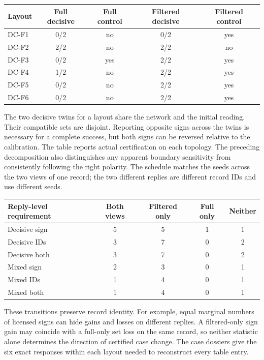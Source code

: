 \documentclass[12pt,letterpaper]{article}
\begin{document}
\begin{center}{\small\setlength{\tabcolsep}{4pt}\begin{tabularx}{\linewidth}{@{}Ycccc@{}}\toprule
Layout & Full decisive & Full control & Filtered decisive & Filtered control\\ \midrule
DC-F1 & 0/2 & no & 0/2 & yes\\
DC-F2 & 2/2 & no & 2/2 & no\\
DC-F3 & 0/2 & yes & 2/2 & yes\\
DC-F4 & 1/2 & no & 2/2 & yes\\
DC-F5 & 0/2 & no & 2/2 & yes\\
DC-F6 & 0/2 & no & 2/2 & yes\\ \bottomrule\end{tabularx}}
\end{center}

The two decisive twins for a layout share the network and the initial reading. Their compatible sets are disjoint. Reporting opposite signs across the twins is necessary for a complete success, but both signs can be reversed relative to the calibration. The table reports actual certification on each topology. The preceding decomposition also distinguishes any apparent boundary sensitivity from consistently following the right polarity. The schedule matches the seeds across the two views of one record; the two different replies are different record IDs and use different seeds.

\begin{center}{\small\setlength{\tabcolsep}{4pt}\begin{tabularx}{\linewidth}{@{}Ycccc@{}}\toprule
Reply-level requirement & Both views & Filtered only & Full only & Neither\\ \midrule
Decisive sign & 5 & 5 & 1 & 1\\
Decisive IDs & 3 & 7 & 0 & 2\\
Decisive both & 3 & 7 & 0 & 2\\
Mixed sign & 2 & 3 & 0 & 1\\
Mixed IDs & 1 & 4 & 0 & 1\\
Mixed both & 1 & 4 & 0 & 1\\ \bottomrule\end{tabularx}}
\end{center}

These transitions preserve record identity. For example, equal marginal numbers of licensed signs can hide gains and losses on different replies. A filtered-only sign gain may coincide with a full-only set loss on the same record, so neither statistic alone determines the direction of certified case change. The case dossiers give the six exact responses within each layout needed to reconstruct every table entry.
\end{document}
